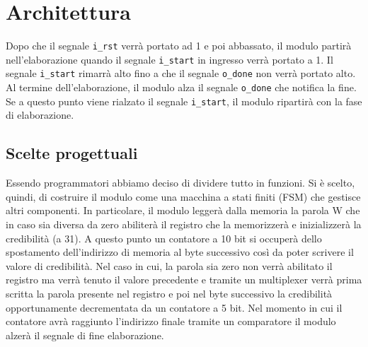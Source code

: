 \section{Architettura}
Dopo che il segnale {\small\lstinline[columns=fixed]{i_rst}} verrà portato ad 1 e poi abbassato, il modulo partirà nell'elaborazione quando il segnale {\small\lstinline[columns=fixed]{i_start}} in ingresso verrà portato a 1. Il segnale \lstinline[columns=fixed]{i_start} rimarrà alto fino a che il segnale \lstinline[columns=fixed]{o_done} non verrà portato alto. Al termine dell'elaborazione, il modulo alza il segnale \lstinline[columns=fixed]{o_done} che notifica la fine. Se a questo punto viene rialzato il segnale \lstinline[columns=fixed]{i_start}, il modulo ripartirà con la fase di elaborazione.

\subsection{Scelte progettuali}
Essendo programmatori abbiamo deciso di dividere tutto in funzioni. Si è scelto, quindi, di costruire il modulo come una macchina a stati finiti (FSM) che gestisce altri componenti.
\newline
In particolare, il modulo leggerà dalla memoria la parola W che in caso sia diversa da zero abiliterà il registro che la memorizzerà e inizializzerà la credibilità (a 31). A questo punto un contatore a 10 bit si occuperà dello spostamento dell'indirizzo di memoria al byte successivo così da poter scrivere il valore di credibilità. Nel caso in cui, la parola sia zero non verrà abilitato il registro ma verrà tenuto il valore precedente e tramite un multiplexer verrà prima scritta la parola presente nel registro e poi nel byte successivo la credibilità opportunamente decrementata da un contatore a 5 bit.
\newline
Nel momento in cui il contatore avrà raggiunto l'indirizzo finale tramite un comparatore il modulo alzerà il segnale di fine elaborazione.

